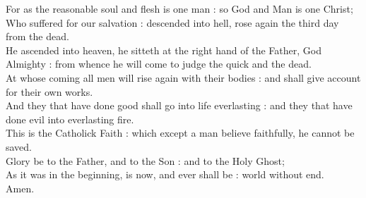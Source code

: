 For as the reasonable soul and flesh is one man : so God and Man is one Christ;\\
Who suffered for our salvation : descended into hell, rose again the third day from the dead.\\
He ascended into heaven, he sitteth at the right hand of the Father, God Almighty : from whence he will come to judge the quick and the dead.\\
At whose coming all men will rise again with their bodies : and shall give account for their own works.\\
And they that have done good shall go into life everlasting : and they that have done evil into everlasting fire.\\
This is the Catholick Faith : which except a man believe faithfully, he cannot be saved.\\

Glory be to the Father, and to the Son : and to the Holy Ghost;\\
As it was in the beginning, is now, and ever shall be : world without end.\\
Amen.

\clearpage
